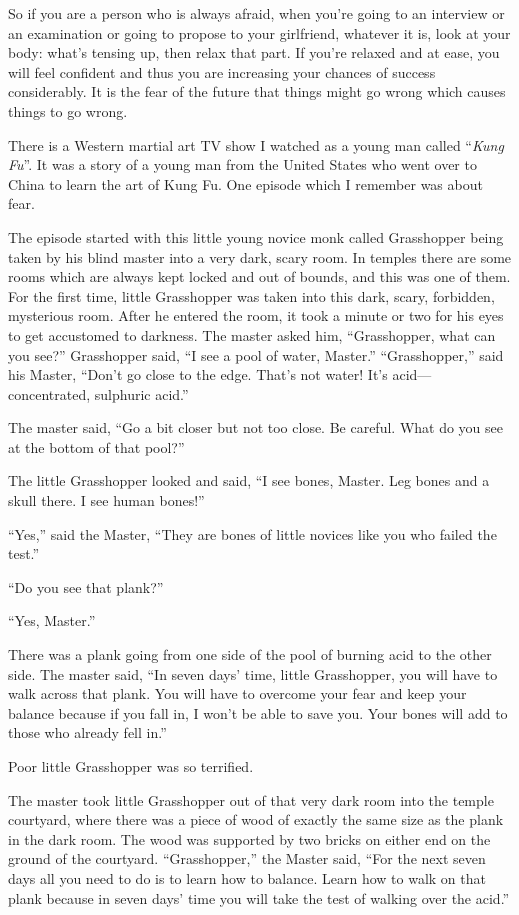 \documentclass[12pt, openany]{book}
\begin{document}
So if you are a person who is always afraid, when you’re going to an interview or an examination or going to propose to your girlfriend, whatever it is, look at your body: what’s tensing up, then relax that part. If you’re relaxed and at ease, you will feel confident and thus you are increasing your chances of success considerably. It is the fear of the future that things might go wrong which causes things to go wrong. 

There is a Western martial art TV show I watched as a young man called “\emph{Kung Fu}”. It was a story of a young man from the United States who went over to China to learn the art of Kung Fu. One episode which I remember was about fear. 

The episode started with this little young novice monk called Grasshopper being taken by his blind master into a very dark, scary room. In temples there are some rooms which are always kept locked and out of bounds, and this was one of them. For the first time, little Grasshopper was taken into this dark, scary, forbidden, mysterious room. After he entered the room, it took a minute or two for his eyes to get accustomed to darkness. The master asked him, “Grasshopper, what can you see?” Grasshopper said, “I see a pool of water, Master.” “Grasshopper,” said his Master, “Don’t go close to the edge. That’s not water! It’s acid—concentrated, sulphuric acid.” 

The master said, “Go a bit closer but not too close. Be careful. What do you see at the bottom of that pool?” 

The little Grasshopper looked and said, “I see bones, Master. Leg bones and a skull there. I see human bones!” 

“Yes,” said the Master, “They are bones of little novices like you who failed the test.” 

“Do you see that plank?” 

“Yes, Master.” 

There was a plank going from one side of the pool of burning acid to the other side. The master said, “In seven days’ time, little Grasshopper, you will have to walk across that plank. You will have to overcome your fear and keep your balance because if you fall in, I won’t be able to save you. Your bones will add to those who already fell in.” 

Poor little Grasshopper was so terrified. 

The master took little Grasshopper out of that very dark room into the temple courtyard, where there was a piece of wood of exactly the same size as the plank in the dark room. The wood was supported by two bricks on either end on the ground of the courtyard. “Grasshopper,” the Master said, “For the next seven days all you need to do is to learn how to balance. Learn how to walk on that plank because in seven days’ time you will take the test of walking over the acid.” 
\end{document}
